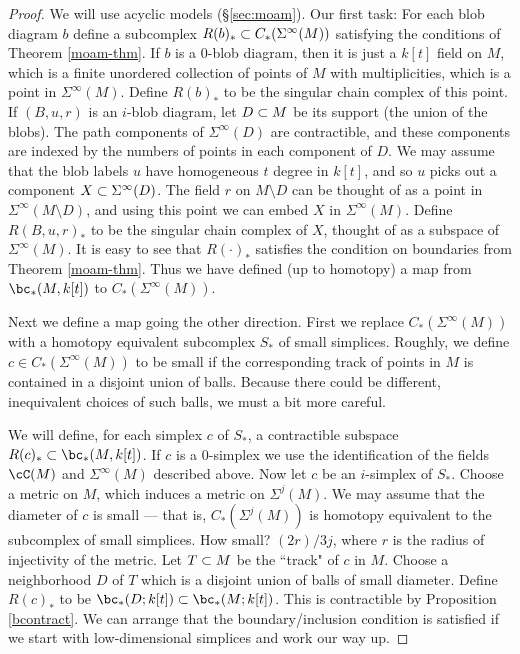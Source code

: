 \begin{proof}
We will use acyclic models (\S \ref{sec:moam}).
Our first task: For each blob diagram $b$ define a subcomplex $R(b)_* \subset C_*(\Sigma^\infty(M))$
satisfying the conditions of Theorem \ref{moam-thm}.
If $b$ is a 0-blob diagram, then it is just a $k[t]$ field on $M$, which is a 
finite unordered collection of points of $M$ with multiplicities, which is
a point in $\Sigma^\infty(M)$.
Define $R(b)_*$ to be the singular chain complex of this point.
If $(B, u, r)$ is an $i$-blob diagram, let $D\subset M$ be its support (the union of the blobs).
The path components of $\Sigma^\infty(D)$ are contractible, and these components are indexed 
by the numbers of points in each component of $D$.
We may assume that the blob labels $u$ have homogeneous $t$ degree in $k[t]$, and so
$u$ picks out a component $X \subset \Sigma^\infty(D)$.
The field $r$ on $M\setminus D$ can be thought of as a point in $\Sigma^\infty(M\setminus D)$,
and using this point we can embed $X$ in $\Sigma^\infty(M)$.
Define $R(B, u, r)_*$ to be the singular chain complex of $X$, thought of as a 
subspace of $\Sigma^\infty(M)$.
It is easy to see that $R(\cdot)_*$ satisfies the condition on boundaries from 
Theorem \ref{moam-thm}.
Thus we have defined (up to homotopy) a map from 
$\bc_*(M, k[t])$ to $C_*(\Sigma^\infty(M))$.

Next we define a map going the other direction.
First we replace $C_*(\Sigma^\infty(M))$ with a homotopy equivalent 
subcomplex $S_*$ of small simplices.
Roughly, we define $c\in C_*(\Sigma^\infty(M))$ to be small if the 
corresponding track of points in $M$
is contained in a disjoint union of balls.
Because there could be different, inequivalent choices of such balls, we must a bit more careful.



We will define, for each simplex $c$ of $S_*$, a contractible subspace
$R(c)_* \sub \bc_*(M, k[t])$.
If $c$ is a 0-simplex we use the identification of the fields $\cC(M)$ and 
$\Sigma^\infty(M)$ described above.
Now let $c$ be an $i$-simplex of $S_*$.
Choose a metric on $M$, which induces a metric on $\Sigma^j(M)$.
We may assume that the diameter of $c$ is small --- that is, $C_*(\Sigma^j(M))$
is homotopy equivalent to the subcomplex of small simplices.
How small?  $(2r)/3j$, where $r$ is the radius of injectivity of the metric.
Let $T\subset M$ be the ``track" of $c$ in $M$.
Choose a neighborhood $D$ of $T$ which is a disjoint union of balls of small diameter.
Define $R(c)_*$ to be $\bc_*(D; k[t]) \sub \bc_*(M; k[t])$.
This is contractible by Proposition \ref{bcontract}.
We can arrange that the boundary/inclusion condition is satisfied if we start with
low-dimensional simplices and work our way up.

\end{proof}



